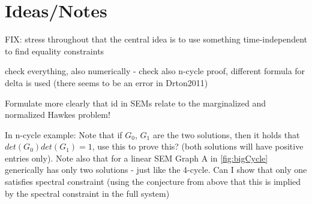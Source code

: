 \documentclass[accepted]{uai2021} %
\begin{document}
\begin{comment}
	can be computed from $\bar{C}$ and it holds that 
	$C^+=\bar{C}_{OO}$. By direct computation, we see that $\Gamma_{43} = 
	C_{14}^+/C_{13}^+$. To obtain a constraint, we find a second method of 
	identification of $\Gamma_{43}$ by noting that
	
	\begin{align}
		\Theta = (I - \Gamma)\bar{C}(I-\Gamma)^T = \bar{C} - 
		\Gamma\bar{C} - \bar{C}\Gamma^T + 
		\Gamma\bar{C}\Gamma^T,
		\label{eq:expandTheta}
	\end{align}

	
	assuming that $\Gamma$ is weakly stable. By considering the 
	$(3,4)$-entry of the above matrix equation,
	
	$$
	\Gamma_{43} = (\bar{C}_{34} - 
	\Gamma_{32}\bar{C}_{24})/(\bar{C}_{33} - 
	\Gamma_{32}\bar{C}_{23}).
	$$
	
 Again, we obtained two ways of identifying 
 the parameter $\Gamma_{43}$, that is, a constraint
 
 $$
 C_{14}^+/C_{13}^+ = (\bar{C}_{34} - 
 \Gamma_{32}\bar{C}_{24})/(\bar{C}_{33} - 
 \Gamma_{32}\bar{C}_{23})
 $$
 
 using that $\Gamma_{32} = {\Phi}_{32}/(1-\Phi_{33})$ is known as 
 ${\Phi}_{32}$ and 
 ${\Phi}_{33}$ are known. This constraint is satisfied in 
 Figure
 \ref{fig:bigCycle}\textbf{A}, 
 but not in \ref{fig:bigCycle}\textbf{B}, and it allows us to 
 distinguish between 
 the two.
 
 \label{exmp:eqBigCycle}
\end{exmp}


\end{comment}



\section{Ideas/Notes}

FIX: stress throughout that the central idea is to use something 
time-independent to find equality constraints

check everything, also numerically - check also n-cycle proof, different 
formula for delta is used (there seems to be an error in Drton2011)

Formulate more clearly that id in SEMs relate to the marginalized and 
normalized Hawkes problem!

In n-cycle example: Note that if $G_0$, $G_1$ are the 
two solutions, then it holds that $det(G_0)det(G_1) = 1$, use this to prove 
this? (both solutions will have positive entries only). Note also that for a 
linear SEM Graph A in \ref{fig:bigCycle} generically has only two solutions - 
just like the 4-cycle. Can I show that only one satisfies spectral constraint 
(using the conjecture from above that this is implied by the spectral 
constraint in the full system)
\end{document}
